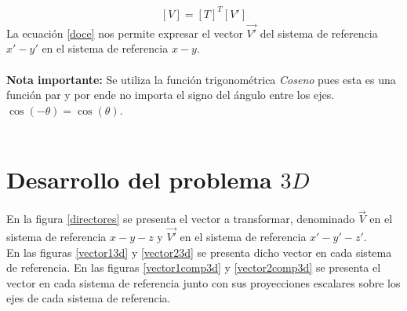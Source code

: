 \documentclass[12pt,letterpaper]{article}
\begin{document}
%
\begin{align}
	\left[ V \right] = \left[ T \right]^T \left[ V' \right] \label{doce}
\end{align}
%
La ecuación \ref{doce} nos permite expresar el vector $\overset{\rightarrow}{V'}$ del sistema de referencia $x'-y'$ en el sistema de referencia $x-y$.\\\\
%
{\bf Nota importante: } Se utiliza la función trigonométrica {\it{Coseno}} pues esta es una función par y por ende no importa el signo del ángulo entre los ejes.\\
$\cos \left( -\theta \right) = \cos \left( \theta \right)$.\\\\


\section{Desarrollo del problema $3D$}
%
En la figura \ref{directores} se presenta el vector a transformar, denominado $\overset{\rightarrow}{V}$ en el sistema de referencia $x-y-z$ y $\overset{\rightarrow}{V'}$ en el sistema de referencia $x'-y'-z'$.\\
%
En las figuras \ref{vector13d} y \ref{vector23d} se presenta dicho vector en cada sistema de referencia. En las figuras \ref{vector1comp3d} y \ref{vector2comp3d} se presenta el vector en cada sistema de referencia junto con sus proyecciones escalares sobre los ejes de cada sistema de referencia.\\\\
\end{document}
